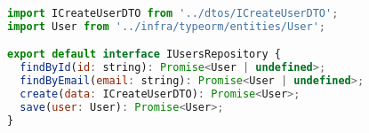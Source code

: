 \begin{lstlisting}[language=JavaScript, caption={Interace a ser implementada},captionpos=b, label=alg:iusersrepository]
import ICreateUserDTO from '../dtos/ICreateUserDTO';
import User from '../infra/typeorm/entities/User';

export default interface IUsersRepository {
  findById(id: string): Promise<User | undefined>;
  findByEmail(email: string): Promise<User | undefined>;
  create(data: ICreateUserDTO): Promise<User>;
  save(user: User): Promise<User>;
}
\end{lstlisting}